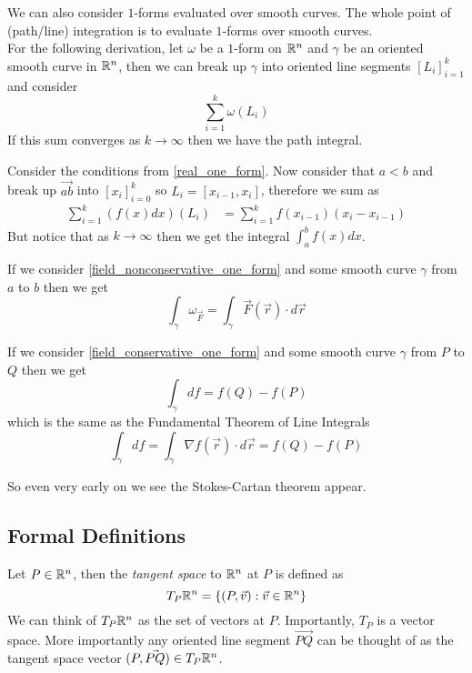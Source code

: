 \documentclass[notes.tex]{subfiles}
\begin{document}
We can also consider $1$-forms evaluated over smooth curves. The whole point of (path/line) integration is to evaluate $1$-forms over smooth curves. \\
For the following derivation, let $\omega$ be a $1$-form on $\mathbb{R}^n$ and $\gamma$ be an oriented smooth curve in $\mathbb{R}^n$, then we can break up $\gamma$ into oriented line segments $[L_i]_{i = 1}^k$ and consider
\[
    \sum_{i = 1}^k\omega(L_i)
\]
If this sum converges as $k \to \infty$ then we have the path integral.

\begin{example}
    Consider the conditions from \cref{real_one_form}. Now consider that $a < b$ and break up $\vec{ab}$ into $[x_i]_{i = 0}^k$ so $L_i = [x_{i - 1}, x_i]$, therefore we sum as
    \begin{align*}
        \sum_{i = 1}^k (f(x)dx)(L_i)
        &= \sum_{i = 1}^k f(x_{i - 1})(x_i - x_{i - 1})
    \end{align*}
    But notice that as $k \to \infty$ then we get the integral $\int_a^b f(x)dx$.
\end{example}

\begin{example}
    If we consider \cref{field_nonconservative_one_form} and some smooth curve $\gamma$ from $a$ to $b$ then we get
    \[
        \int_\gamma \omega_{\vec{F}} = \int_\gamma \vec{F}(\vec{r})\cdot d\vec{r}
    \]
\end{example}

\begin{example}
    If we consider \cref{field_conservative_one_form} and some smooth curve $\gamma$ from $P$ to $Q$ then we get
    \[
        \int_\gamma df = f(Q) - f(P)
    \]
    which is the same as the Fundamental Theorem of Line Integrals
    \[
        \int_\gamma df = \int_\gamma \nabla f(\vec{r})\cdot d\vec{r} = f(Q) - f(P)
    \]
\end{example}
So even very early on we see the Stokes-Cartan theorem appear.

\subsection{Formal Definitions}
\begin{definition}
    Let $P \in \mathbb{R}^n$, then the \textit{tangent space} to $\mathbb{R}^n$ at $P$ is defined as
    \[
        T_P \mathbb{R}^n = \{ (P, \vec{v}) : \vec{v} \in \mathbb{R}^n \}
    \]
    We can think of $T_P\mathbb{R}^n$ as the set of vectors at $P$. Importantly, $T_P$ is a vector space. More importantly any oriented line segment $\vec{PQ}$ can be thought of as the tangent space vector $(P, \vec{PQ}) \in T_P\mathbb{R}^n$.
\end{definition}
\end{document}
